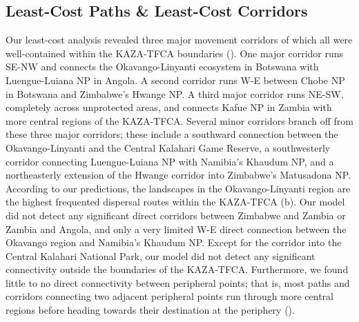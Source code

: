 \documentclass[abstract=on,10pt,a4paper,bibliography=totocnumbered]{article}
\begin{document}
\subsection{Least-Cost Paths \& Least-Cost Corridors}
Our least-cost analysis revealed three major movement corridors of which all
were well-contained within the KAZA-TFCA boundaries (). One
major corridor runs SE-NW and connects the Okavango-Linyanti ecosystem in
Botswana with Luengue-Luiana NP in Angola. A second corridor runs W-E between
Chobe NP in Botswana and Zimbabwe's Hwange NP. A third major corridor runs
NE-SW, completely across unprotected areas, and connects Kafue NP in Zambia with
more central regions of the KAZA-TFCA. Several minor corridors branch off from
these three major corridors; these include a southward connection between the
Okavango-Linyanti and the Central Kalahari Game Reserve, a southwesterly
corridor connecting Luengue-Luiana NP with Namibia's Khaudum NP, and a
northeasterly extension of the Hwange corridor into Zimbabwe's Matusadona NP.
According to our predictions, the landscapes in the Okavango-Linyanti region are
the highest frequented dispersal routes within the KAZA-TFCA
(b). Our model did not detect any significant direct corridors
between Zimbabwe and Zambia or Zambia and Angola, and only a very limited W-E
direct connection between the Okavango region and Namibia's Khaudum NP. Except
for the corridor into the Central Kalahari National Park, our model did not
detect any significant connectivity outside the boundaries of the KAZA-TFCA.
Furthermore, we found little to no direct connectivity between peripheral
points; that is, most paths and corridors connecting two adjacent peripheral
points run through more central regions before heading towards their destination
at the periphery ().
\end{document}
